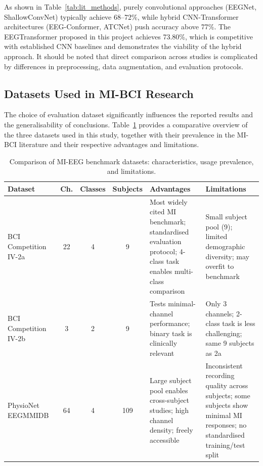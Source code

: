 \documentclass[12pt, a4paper]{article}
\begin{document}
As shown in Table~\ref{tab:lit_methods}, purely convolutional approaches (EEGNet, ShallowConvNet) typically achieve 68--72\%, while hybrid CNN-Transformer architectures (EEG-Conformer, ATCNet) push accuracy above 77\%. The EEGTransformer proposed in this project achieves 73.80\%, which is competitive with established CNN baselines and demonstrates the viability of the hybrid approach. It should be noted that direct comparison across studies is complicated by differences in preprocessing, data augmentation, and evaluation protocols.

\subsection{Datasets Used in MI-BCI Research}

The choice of evaluation dataset significantly influences the reported results and the generalisability of conclusions. Table~\ref{tab:lit_datasets} provides a comparative overview of the three datasets used in this study, together with their prevalence in the MI-BCI literature and their respective advantages and limitations.

\begin{table}[htbp]
\centering
\caption{Comparison of MI-EEG benchmark datasets: characteristics, usage prevalence, and limitations.}
\label{tab:lit_datasets}
\begin{tabular}{@{} >{\raggedright\arraybackslash}p{2.8cm} c c c >{\raggedright\arraybackslash}p{3.5cm} >{\raggedright\arraybackslash}p{3.5cm} @{}}
\toprule
\textbf{Dataset} & \textbf{Ch.} & \textbf{Classes} & \textbf{Subjects} & \textbf{Advantages} & \textbf{Limitations} \\
\midrule
BCI Competition IV-2a~\cite{tangermann2012bci} & 22 & 4 & 9 & Most widely cited MI benchmark; standardised evaluation protocol; 4-class task enables multi-class comparison & Small subject pool (9); limited demographic diversity; may overfit to benchmark \\[6pt]
BCI Competition IV-2b~\cite{tangermann2012bci} & 3 & 2 & 9 & Tests minimal-channel performance; binary task is clinically relevant & Only 3 channels; 2-class task is less challenging; same 9 subjects as 2a \\[6pt]
PhysioNet EEGMMIDB~\cite{goldberger2000physiobank} & 64 & 4 & 109 & Large subject pool enables cross-subject studies; high channel density; freely accessible & Inconsistent recording quality across subjects; some subjects show minimal MI responses; no standardised training/test split \\
\bottomrule
\end{tabular}
\end{table}
\end{document}
